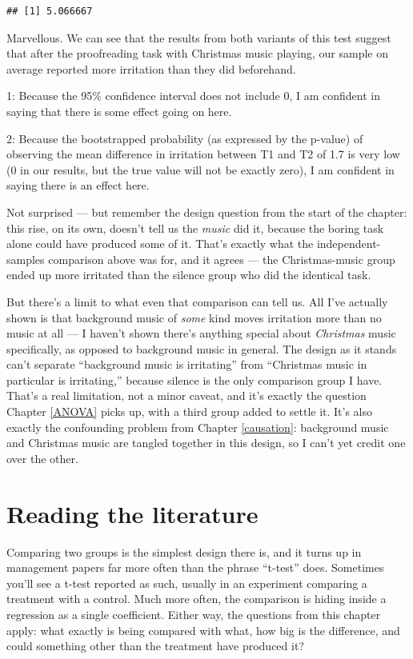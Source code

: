 \documentclass[
]{book}
\begin{document}
\begin{verbatim}
## [1] 5.066667
\end{verbatim}

Marvellous. We can see that the results from both variants of this test suggest that after the proofreading task with Christmas music playing, our sample on average reported more irritation than they did beforehand.

1: Because the 95\% confidence interval does not include 0, I am confident in saying that there is some effect going on here.

2: Because the bootstrapped probability (as expressed by the p-value) of observing the mean difference in irritation between T1 and T2 of 1.7 is very low (0 in our results, but the true value will not be exactly zero), I am confident in saying there is an effect here.

Not surprised --- but remember the design question from the start of the chapter: this rise, on its own, doesn't tell us the \emph{music} did it, because the boring task alone could have produced some of it. That's exactly what the independent-samples comparison above was for, and it agrees --- the Christmas-music group ended up more irritated than the silence group who did the identical task.

But there's a limit to what even that comparison can tell us. All I've actually shown is that background music of \emph{some} kind moves irritation more than no music at all --- I haven't shown there's anything special about \emph{Christmas} music specifically, as opposed to background music in general. The design as it stands can't separate ``background music is irritating'' from ``Christmas music in particular is irritating,'' because silence is the only comparison group I have. That's a real limitation, not a minor caveat, and it's exactly the question Chapter \ref{ANOVA} picks up, with a third group added to settle it. It's also exactly the confounding problem from Chapter \ref{causation}: background music and Christmas music are tangled together in this design, so I can't yet credit one over the other.

\section{Reading the literature}\label{t-test-reading}

Comparing two groups is the simplest design there is, and it turns up in management papers far more often than the phrase ``t-test'' does. Sometimes you'll see a t-test reported as such, usually in an experiment comparing a treatment with a control. Much more often, the comparison is hiding inside a regression as a single coefficient. Either way, the questions from this chapter apply: what exactly is being compared with what, how big is the difference, and could something other than the treatment have produced it?
\end{document}
